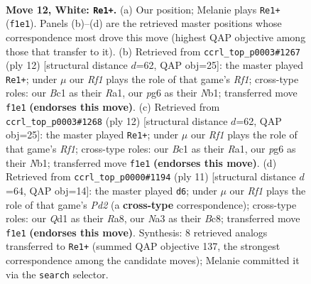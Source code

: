 \documentclass[11pt]{article}
\begin{document}
\clearpage

\begin{figure}[p]\centering
\begin{subfigure}{0.46\textwidth}\centering
\resizebox{\linewidth}{!}{%
\newchessgame
\chessboard[
  setfen={rnbqkb1r/ppp5/1n3pp1/3p2Np/P2P4/NB6/1PP2PPP/R1BQ1RK1 w kq - 0 12},
  showmover=false,
  pgfstyle=straightmove, color=movearrow, markmove={f1-e1}
]}
\caption{}
\end{subfigure}\hfill
\begin{subfigure}{0.46\textwidth}\centering
\resizebox{\linewidth}{!}{%
\newchessgame
\chessboard[
  setfen={rnbqkb1r/pp3ppp/5n2/3p4/2pP4/3B1N2/PPP2PPP/RNBQ1RK1 w kq - 0 7},
  showmover=false,
  pgfstyle=straightmove, color=movearrow, markmove={f1-e1}
]}
\caption{}
\end{subfigure}
\\[4pt]
\begin{subfigure}{0.46\textwidth}\centering
\resizebox{\linewidth}{!}{%
\newchessgame
\chessboard[
  setfen={rnbqkb1r/pp3ppp/5n2/3p4/2pP4/3B1N2/PPP2PPP/RNBQ1RK1 w kq - 0 7},
  showmover=false,
  pgfstyle=straightmove, color=movearrow, markmove={f1-e1}
]}
\caption{}
\end{subfigure}\hfill
\begin{subfigure}{0.46\textwidth}\centering
\resizebox{\linewidth}{!}{%
\newchessgame
\chessboard[
  setfen={r1b1kbnr/ppqp1ppp/2n1p3/8/3NP3/2N3P1/PPP2P1P/R1BQKB1R b KQkq - 0 6},
  showmover=false,
  pgfstyle=straightmove, color=movearrow, markmove={d7-d6}
]}
\caption{}
\end{subfigure}
\caption{\textbf{Move 12, White: \texttt{Re1+}.} (a) Our position; Melanie plays \texttt{Re1+} (\texttt{f1e1}). Panels (b)--(d) are the retrieved master positions whose correspondence most drove this move (highest QAP objective among those that transfer to it). (b) Retrieved from \texttt{ccrl\_top\_p0003\#1267} (ply 12) [structural distance $d$=62, QAP obj=25]: the master played \texttt{Re1+}; under $\mu$ our \emph{Rf1} plays the role of that game's \emph{Rf1}; cross-type roles: our \emph{B}c1 as their \emph{R}a1, our \emph{p}g6 as their \emph{N}b1; transferred move \texttt{f1e1} \textbf{(endorses this move)}. (c) Retrieved from \texttt{ccrl\_top\_p0003\#1268} (ply 12) [structural distance $d$=62, QAP obj=25]: the master played \texttt{Re1+}; under $\mu$ our \emph{Rf1} plays the role of that game's \emph{Rf1}; cross-type roles: our \emph{B}c1 as their \emph{R}a1, our \emph{p}g6 as their \emph{N}b1; transferred move \texttt{f1e1} \textbf{(endorses this move)}. (d) Retrieved from \texttt{ccrl\_top\_p0000\#1194} (ply 11) [structural distance $d$=64, QAP obj=14]: the master played \texttt{d6}; under $\mu$ our \emph{Rf1} plays the role of that game's \emph{Pd2} (a \textbf{cross-type} correspondence); cross-type roles: our \emph{Q}d1 as their \emph{R}a8, our \emph{N}a3 as their \emph{B}c8; transferred move \texttt{f1e1} \textbf{(endorses this move)}. Synthesis: 8 retrieved analogs transferred to \texttt{Re1+} (summed QAP objective 137, the strongest correspondence among the candidate moves); Melanie committed it via the \texttt{search} selector.}
\label{fig:thought-m22}
\end{figure}
\end{document}

